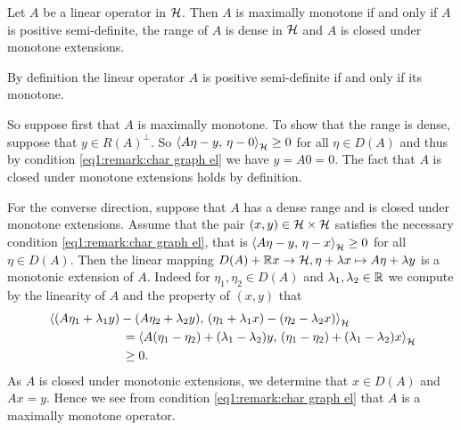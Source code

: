 \begin{example}\label{example:sem pos def lin op is max mon}
	Let $ A $ be a linear operator in $ \mathcal{H} $. Then
	$ A $ is maximally monotone if and only if $ A $
	is positive semi-definite, the range of $ A $
	is dense in $ \mathcal{H} $ and $ A $ is closed under
	monotone extensions. \smallskip
	
	By definition the linear operator $ A $ is
	positive semi-definite if and only if its
	monotone.\smallskip
	
	So suppose first that $ A $ is maximally monotone.
	To show that the range is dense, suppose that $ y\in R(A)^{\bot} $. 
	So $ \left\langle A\eta-y,\,\eta-0\right\rangle_{\mathcal{H}}\geq 0 $ for all 
	$ \eta\in D(A) $ and thus by condition 
	\eqref{eq1:remark:char graph el} we have $ y=A0=0 $.
	The fact that $ A $ is closed under monotone 
	extensions holds by definition.\smallskip
	
	For the converse direction, suppose that $ A $ has
	a dense range and is closed under monotone extensions. 
	Assume that the pair $ (x,y)\in \mathcal{H}\times \mathcal{H} $
	satisfies the necessary condition \eqref{eq1:remark:char graph el},
	that is $ \left\langle A\eta-y,\,\eta-x\right\rangle_{\mathcal{H}}\geq 0 $ for all $ \eta\in D(A) $. 
	Then the linear mapping $ D(A)+\mathbb{R} x\rightarrow\mathcal{H}, 
	\eta+\lambda x\mapsto A\eta+\lambda y$ is a monotonic
	extension of $ A $. Indeed for $ \eta_1,\eta_2\in D(A) $
	and $ \lambda_1,\lambda_2\in\mathbb{R} $ we compute by the linearity
	of $ A $ and the property of $ (x,y) $ that
	\begin{align*}
		&\left\langle (A\eta_1+\lambda_1 y)-(A\eta_2+\lambda_2 y),\,(\eta_1+\lambda_1 x)
		-(\eta_2-\lambda_2 x)\right\rangle_{\mathcal{H}}\\
		&\qquad\qquad\qquad
		=\left\langle A(\eta_1-\eta_2)+(\lambda_1-\lambda_2)y,\,
			(\eta_1-\eta_2)+(\lambda_1-\lambda_2)x\right\rangle_{\mathcal{H}}\\
		&\qquad\qquad\qquad\geq 0.
	\end{align*}
	As $ A $ is closed under monotonic extensions, we 
	determine that $ x\in D(A) $ and $ Ax=y $. Hence we see
	from condition \eqref{eq1:remark:char graph el} that
	$ A $ is a maximally monotone operator.
\end{example}

